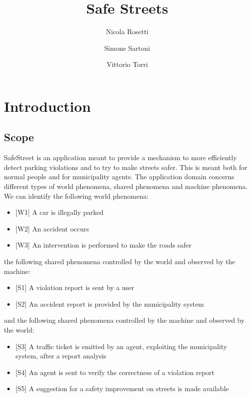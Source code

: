\documentclass[a4paper]{report}
\begin{document}
\titleformat{\chapter}[hang] 
{\normalfont\huge\bfseries}{\thechapter}{1em}{} 

\author{Nicola Rosetti \and Simone Sartoni \and Vittorio Torri}
\title{Safe Streets}
\date{}
\maketitle

\tableofcontents

\chapter{Introduction}
\section{Scope}
SafeStreet is an application meant to provide a mechanism to more efficiently detect parking violations and to try to make streets safer. This is meant both for normal people and for municipality agents. 
The application domain concerns different types of world phenomena, shared phenomena and machine phenomena. \\
We can identify the following world phenomena:
\begin{itemize}
\item {[W1]} A car is illegally parked 
\item {[W2]} An accident occurs
\item {[W3]} An intervention is performed to make the roads safer
\end{itemize} 
the following shared phenomena controlled by the world and observed by the machine:
\begin{itemize}
\item {[S1]} A violation report is sent by a user
\item {[S2]} An accident report is provided by the municipality system
\end{itemize}
and the following shared phenomena controlled by the machine and observed by the world:
\begin{itemize}
\item {[S3]} A traffic ticket is emitted by an agent, exploiting the municipality system, after a report analysis
\item {[S4]} An agent is sent to verify the correctness of a violation report
\item {[S5]} A suggestion for a safety improvement on streets is made available
\end{itemize}
\end{document}
